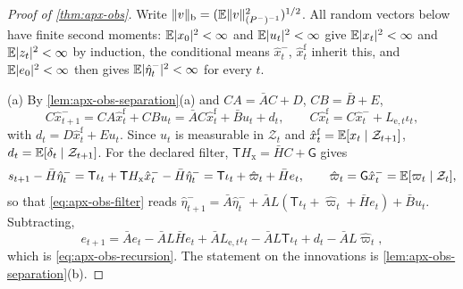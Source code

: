 \begin{proof}[Proof of \cref{thm:apx-obs}]
Write $\Vert v\Vert_{\mathrm b}=(\mathbb{E}\Vert v\Vert^2_{(P^-)^{-1}})^{1/2}$. All random vectors below have finite second moments: $\mathbb{E}\lvert x_0\rvert^2<\infty$ and $\mathbb{E}\lvert u_t\rvert^2<\infty$ give $\mathbb{E}\lvert x_t\rvert^2<\infty$ and $\mathbb{E}\lvert z_t\rvert^2<\infty$ by induction, the conditional means $\hat x^-_t$, $\hat x^{\mathrm f}_t$ inherit this, and $\mathbb{E}\lvert e_0\rvert^2<\infty$ then gives $\mathbb{E}\lvert\hat\eta^-_t\rvert^2<\infty$ for every $t$.

(a) By \cref{lem:apx-obs-separation}(a) and $CA=\bar AC+D$, $CB=\bar B+E$,
\begin{equation*}
C\hat x^-_{t+1}=CA\hat x^{\mathrm f}_t+CBu_t=\bar AC\hat x^{\mathrm f}_t+\bar Bu_t+d_t,\qquad C\hat x^{\mathrm f}_t=C\hat x^-_t+L_{\mathrm e,t}\iota_t,
\end{equation*}
with $d_t=D\hat x^{\mathrm f}_t+Eu_t$. Since $u_t$ is measurable in $\mathcal Z_t$ and $\hat x^{\mathrm f}_t=\mathbb{E}[x_t\mid\mathcal Z_{t+1}]$, $d_t=\mathbb{E}[\delta_t\mid\mathcal Z_{t+1}]$. For the declared filter, $\mathsf TH_{\mathrm x}=\bar HC+\mathsf G$ gives
\begin{equation*}
s_{t+1}-\bar H\hat\eta^-_t=\mathsf T\iota_t+\mathsf TH_{\mathrm x}\hat x^-_t-\bar H\hat\eta^-_t=\mathsf T\iota_t+\hat\varpi_t+\bar He_t,\qquad\hat\varpi_t=\mathsf G\hat x^-_t=\mathbb{E}[\varpi_t\mid\mathcal Z_t],
\end{equation*}
so that \eqref{eq:apx-obs-filter} reads $\hat\eta^-_{t+1}=\bar A\hat\eta^-_t+\bar AL(\mathsf T\iota_t+\hat\varpi_t+\bar He_t)+\bar Bu_t$. Subtracting,
\begin{equation*}
e_{t+1}=\bar Ae_t-\bar AL\bar He_t+\bar AL_{\mathrm e,t}\iota_t-\bar AL\mathsf T\iota_t+d_t-\bar AL\hat\varpi_t ,
\end{equation*}
which is \eqref{eq:apx-obs-recursion}. The statement on the innovations is \cref{lem:apx-obs-separation}(b).


\end{proof}
